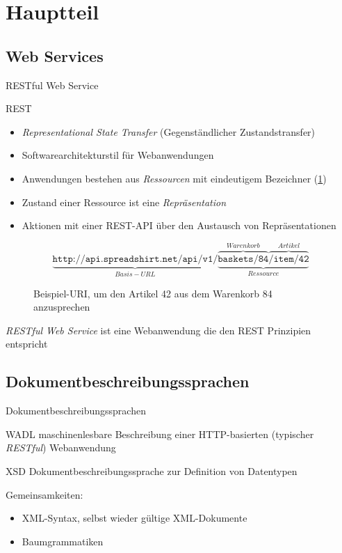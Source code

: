\section{Hauptteil}

\subsection{Web Services}
\begin{frame}{RESTful Web Service}
    \begin{block}{REST}
        \begin{itemize}
            \item \emph{Representational State Transfer} (Gegenständlicher Zustandstransfer)
            \item Softwarearchitekturstil für Webanwendungen
            \item Anwendungen bestehen aus \emph{Ressourcen} mit eindeutigem Bezeichner (\cref{restURI}) %
            \item Zustand einer Ressource ist eine \emph{Repräsentation}
            \item Aktionen mit einer REST-API über den Austausch von Repräsentationen
        \end{itemize}
    \end{block}
\end{frame}

\begin{frame}
    \begin{figure}
        \centering
        \[
            \underbrace{\texttt{http://api.spreadshirt.net/api/v1/}}_{Basis-URL}\underbrace{\overbrace{\texttt{baskets/84}}^{Warenkorb}\overbrace{\texttt{/item/42}}^{Artikel}}_{Ressource}
        \]
        \caption{Beispiel-URI, um den Artikel 42 aus dem Warenkorb 84 anzusprechen}
        \label{restURI}
    \end{figure}
    \emph{RESTful Web Service} ist eine Webanwendung die den REST Prinzipien entspricht
\end{frame}

\subsection{Dokumentbeschreibungssprachen}
\begin{frame}[squeeze]{Dokumentbeschreibungssprachen}
    \begin{block}{WADL}
        maschinenlesbare Beschreibung einer HTTP-basierten (typischer \emph{RESTful}) Webanwendung
    \end{block}
    \begin{block}{XSD}
        Dokumentbeschreibungssprache zur Definition von Datentypen
    \end{block}
    Gemeinsamkeiten:
    \begin{itemize}
        \item XML-Syntax, selbst wieder gültige XML-Dokumente
        \item Baumgrammatiken
    \end{itemize}
\end{frame}

